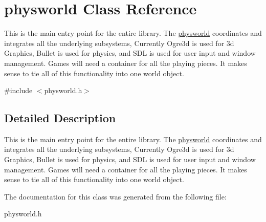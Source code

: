 \hypertarget{classphysworld}{
\section{physworld Class Reference}
\label{d5/d35/classphysworld}
}


This is the main entry point for the entire library. The \hyperlink{classphysworld}{physworld} coordinates and integrates all the underlying subsystems, Currently Ogre3d is used for 3d Graphics, Bullet is used for physics, and SDL is used for user input and window management. Games will need a container for all the playing pieces. It makes sense to tie all of this functionality into one world object.  


{\ttfamily \#include $<$physworld.h$>$}

\subsection{Detailed Description}
This is the main entry point for the entire library. The \hyperlink{classphysworld}{physworld} coordinates and integrates all the underlying subsystems, Currently Ogre3d is used for 3d Graphics, Bullet is used for physics, and SDL is used for user input and window management. Games will need a container for all the playing pieces. It makes sense to tie all of this functionality into one world object. 

The documentation for this class was generated from the following file:\begin{DoxyCompactItemize}
\item 
physworld.h\end{DoxyCompactItemize}
